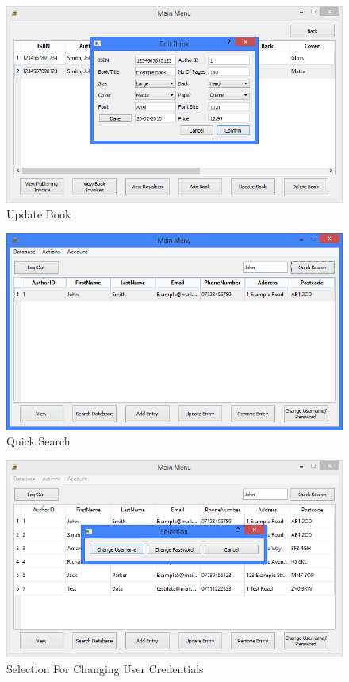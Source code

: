 \begin{figure}[H]
    \caption{Update Book} \label{fig:UpdateBook}
    \includegraphics[width=\textwidth]{./Maintenance/UserInterface/UpdateBook.png}
\end{figure}

\begin{figure}[H]
    \caption{Quick Search} \label{fig:QuickSearch}
    \includegraphics[width=\textwidth]{./Maintenance/UserInterface/QuickSearch.png}
\end{figure}

\begin{figure}[H]
    \caption{Selection For Changing User Credentials} \label{fig:ChangeSelection}
    \includegraphics[width=\textwidth]{./Maintenance/UserInterface/ChangeSelection.png}
\end{figure}

